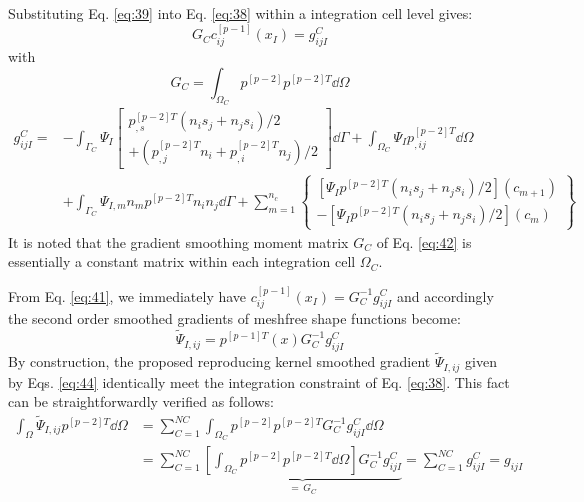 Substituting Eq. \eqref{eq:39} into Eq. \eqref{eq:38} within a integration cell level gives:
\begin{equation}\label{eq:41}
G_Cc_{ij}^{[p-1]}(x_I)=g_{ijI}^{C}
\end{equation}
with
\begin{equation}\label{eq:42}
G_C=\int_{\Omega_C}p^{[p-2]}p^{[p-2]T}\dd\Omega
\end{equation}
\begin{equation}\label{eq:43}
\begin{aligned}
g_{ijI}^{C}={}&-\int_{\Gamma_C}\Psi_I\left[\begin{matrix}p^{[p-2]T}_{,s}\left(n_is_j+n_js_i\right)/2\\[2pt]
+\left(p^{[p-2]T}_{,j}n_i+p^{[p-2]T}_{,i}n_j\right)/2\end{matrix}\right]\dd\Gamma
+\int_{\Omega_C}\Psi_Ip^{[p-2]T}_{,ij}\dd\Omega\\
&+\int_{\Gamma_C}\Psi_{I,m}n_mp^{[p-2]T}n_in_j\dd\Gamma
+\sum_{m=1}^{n_c}\left\{\begin{matrix}\left[\Psi_Ip^{[p-2]T}\left(n_is_j+n_js_i\right)/2\right](c_{m+1})\\[4pt]
-\left[\Psi_Ip^{[p-2]T}\left(n_is_j+n_js_i\right)/2\right](c_m)\end{matrix}\right\}
\end{aligned}
\end{equation}
It is noted that the gradient smoothing moment matrix $G_C$ of Eq. \eqref{eq:42} is essentially a constant matrix within each integration cell $\Omega_C$.

From Eq. \eqref{eq:41}, we immediately have $c_{ij}^{[p-1]}(x_I)=G_C^{-1}g_{ijI}^{C}$ and accordingly the second order smoothed gradients of meshfree shape functions become:
\begin{equation}\label{eq:44}
\tilde{\Psi}_{I,ij}=p^{[p-1]T}(x)G_C^{-1}g_{ijI}^{C}
\end{equation}
By construction, the proposed reproducing kernel smoothed gradient $\tilde{\Psi}_{I,ij}$ given by Eqs. \eqref{eq:44} identically meet the integration constraint of Eq. \eqref{eq:38}.
This fact can be straightforwardly verified as follows:
\begin{equation}\label{eq:45}
\begin{aligned}
\int_{\Omega}\tilde{\Psi}_{I,ij}p^{[p-2]T}\dd\Omega
&=\sum_{C=1}^{NC}\int_{\Omega_C}p^{[p-2]}p^{[p-2]T}G_C^{-1}g_{ijI}^{C}\dd\Omega\\
&=\sum_{C=1}^{NC}\underbrace{\left[\int_{\Omega_C}p^{[p-2]}p^{[p-2]T}\dd\Omega\right]G_C^{-1}g_{ijI}^{C}}_{=\,G_C}
=\sum_{C=1}^{NC}g_{ijI}^{C}=g_{ijI}
\end{aligned}
\end{equation}
